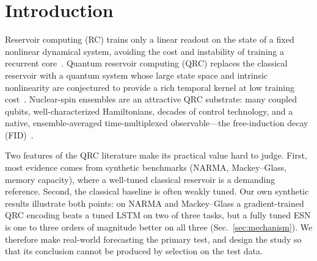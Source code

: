 \documentclass[aps,prresearch,preprint,superscriptaddress,amsmath,amssymb,floatfix]{revtex4-2}
\begin{document}
\begin{abstract}
and of linear AR in 9/9, but never better than the ESN, which is significantly ahead
in 6/9 (mean $\Delta R^2=-0.011$; worst in Lagos, $-0.049$, where slow temperature
anomalies demand long memory). The QRC fails under input distribution shift; a
pre-registered test on two untouched, shifted series confirms that classical level
handling (last-value re-centring plus raw input lags) removes most of the failure, but
it gives the QRC no edge over the tuned classical models. On synthetic tasks a
gradient-trained encoding improves the reservoir through its cross-step memory, yet a
tuned ESN is one to three orders of magnitude better. We claim non-inferiority to tuned
classical models on most untouched real-world data, and no quantum advantage.
\end{abstract}

\maketitle

\section{Introduction}\label{sec:intro}
Reservoir computing (RC) trains only a linear readout on the state of a fixed
nonlinear dynamical system, avoiding the cost and instability of training a recurrent
core~\cite{Jaeger2001,Maass2002,Lukosevicius2009,Tanaka2019}. Quantum reservoir
computing (QRC) replaces the classical reservoir with a quantum system whose large
state space and intrinsic nonlinearity are conjectured to provide a rich temporal
kernel at low training cost~\cite{Fujii2017,Nakajima2019,Mujal2021}. Nuclear-spin
ensembles are an attractive QRC substrate: many coupled qubits, well-characterized
Hamiltonians, decades of control technology, and a native, ensemble-averaged
time-multiplexed observable---the free-induction decay
(FID)~\cite{Negoro2018,Hou2026,VandersypenChuang2005}.

Two features of the QRC literature make its practical value hard to judge. First,
most evidence comes from synthetic benchmarks (NARMA, Mackey--Glass, memory
capacity), where a well-tuned classical reservoir is a demanding reference. Second,
the classical baseline is often weakly tuned. Our own synthetic results illustrate
both points: on NARMA and Mackey--Glass a gradient-trained QRC encoding beats a tuned
LSTM on two of three tasks, but a fully tuned ESN is one to three orders of magnitude
better on all three (Sec.~\ref{sec:mechanism}). We therefore make real-world
forecasting the primary test, and design the study so that its conclusion cannot be
produced by selection on the test data.
\end{document}
